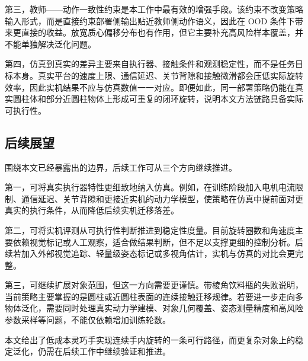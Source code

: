 第三，教师——动作一致性约束是本工作中最有效的增强手段。该约束不改变策略输入形式，而是直接约束部署侧输出贴近教师侧动作语义，因此在 OOD 条件下带来更直接的收益。放宽质心偏移分布也有作用，但它主要补充高风险样本覆盖，并不能单独解决泛化问题。

第四，仿真到真实的差异主要来自执行器、接触条件和观测稳定性，而不是任务目标本身。真实平台的速度上限、通信延迟、关节背隙和接触微滑都会压低实际旋转效率，因此实机结果不应与仿真数值一一对应。即便如此，同一部署策略仍能在真实圆柱体和部分近圆柱物体上形成可重复的闭环旋转，说明本文方法链路具备实际可执行性。

\subsection{后续展望}
\thesisbodyfont
围绕本文已经暴露出的边界，后续工作可从三个方向继续推进。

第一，可将真实执行器特性更细致地纳入仿真。例如，在训练阶段加入电机电流限制、通信延迟、关节背隙和更接近实机的动力学模型，使策略在仿真中提前面对更真实的执行条件，从而降低后续实机迁移落差。

第二，可将实机评测从可执行性判断推进到稳定性度量。目前旋转圈数和角速度主要依赖视觉标记或人工观察，适合做结果判断，但不足以支撑更细的控制分析。后续若加入外部视觉追踪、轻量级姿态标记或多视角估计，实机与仿真的对比会更完整。

第三，可继续扩展对象范围，但这一方向需要更谨慎。带棱角饮料瓶的失败说明，当前策略主要掌握的是圆柱或近圆柱表面的连续接触迁移规律。若要进一步走向多物体泛化，需要同时处理真实动力学建模、对象几何覆盖、姿态测量精度和高风险参数采样等问题，不能仅依赖增加训练轮数。

本文给出了低成本灵巧手实现连续手内旋转的一条可行路径，而更复杂对象上的稳定泛化，仍需在后续工作中继续验证和推进。
